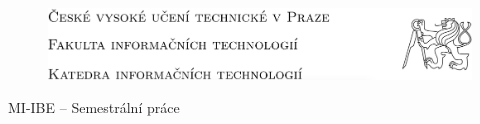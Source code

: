 \vspace*{2cm}

\begin{figure}[H]
    \centering
    \includegraphics[width=\textwidth]{MI-IBE/assets/logo.png}
\end{figure}

{\setlength{\parindent}{0cm}
    \vspace*{6cm}

    \large{MI-IBE -- Semestrální práce}\\

    \Large{
        \@title

        \textit{\@author}
    }

    \vspace*{6cm}

    \normalsize{\@date}
}